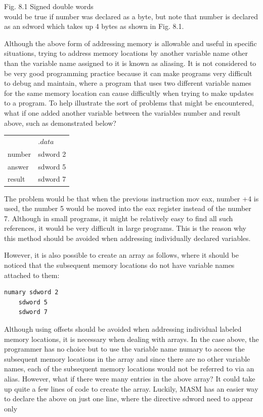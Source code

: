 \documentclass[10pt]{article}
\begin{document}
Fig. 8.1 Signed double words\\
would be true if number was declared as a byte, but note that number is declared as an sdword which takes up 4 bytes as shown in Fig. 8.1.

Although the above form of addressing memory is allowable and useful in specific situations, trying to address memory locations by another variable name other than the variable name assigned to it is known as aliasing. It is not considered to be very good programming practice because it can make programs very difficult to debug and maintain, where a program that uses two different variable names for the same memory location can cause difficultly when trying to make updates to a program. To help illustrate the sort of problems that might be encountered, what if one added another variable between the variables number and result above, such as demonstrated below?

\begin{center}
\begin{tabular}{ll}
 & .$d a t a$ \\
number & sdword 2 \\
answer & sdword 5 \\
result & sdword 7 \\
\end{tabular}
\end{center}

The problem would be that when the previous instruction mov eax, number +4 is used, the number 5 would be moved into the eax register instead of the number 7. Although in small programs, it might be relatively easy to find all such references, it would be very difficult in large programs. This is the reason why this method should be avoided when addressing individually declared variables.

However, it is also possible to create an array as follows, where it should be noticed that the subsequent memory locations do not have variable names attached to them:

\begin{verbatim}
numary sdword 2
    sdword 5
    sdword 7
\end{verbatim}

Although using offsets should be avoided when addressing individual labeled memory locations, it is necessary when dealing with arrays. In the case above, the programmer has no choice but to use the variable name numary to access the subsequent memory locations in the array and since there are no other variable names, each of the subsequent memory locations would not be referred to via an alias. However, what if there were many entries in the above array? It could take up quite a few lines of code to create the array. Luckily, MASM has an easier way to declare the above on just one line, where the directive sdword need to appear only
\end{document}
